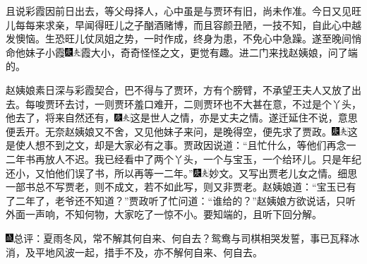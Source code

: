 且说彩霞因前日出去，等父母择人，心中虽是与贾环有旧，尚未作准。今日又见旺儿每每来求亲，早闻得旺儿之子酗酒赌博，而且容颜丑陋，一技不知，自此心中越发懊恼。生恐旺儿仗凤姐之势，一时作成，终身为患，不免心中急躁。遂至晚间悄命他妹子小霞{\includegraphics[width=3mm]{../Images/00004}\includegraphics[width=3mm]{../Images/00012}\footnotesize \kaishu 霞大小，奇奇怪怪之文，更觉有趣。}进二门来找赵姨娘，问了端的。

赵姨娘素日深与彩霞契合，巴不得与了贾环，方有个膀臂，不承望王夫人又放了出去。每唆贾环去讨，一则贾环羞口难开，二则贾环也不大甚在意，不过是个丫头，他去了，将来自然还有，{\includegraphics[width=3mm]{../Images/00004}\includegraphics[width=3mm]{../Images/00012}\footnotesize \kaishu 这是世人之情，亦是丈夫之情。}遂迁延住不说，意思便丢开。无奈赵姨娘又不舍，又见他妹子来问，是晚得空，便先求了贾政。{\includegraphics[width=3mm]{../Images/00004}\includegraphics[width=3mm]{../Images/00012}\footnotesize \kaishu 这是使人想不到之文，却是大家必有之事。}贾政因说道：“且忙什么，等他们再念一二年书再放人不迟。我已经看中了两个丫头，一个与宝玉，一个给环儿。只是年纪还小，又怕他们误了书，所以再等一二年。”{\includegraphics[width=3mm]{../Images/00004}\includegraphics[width=3mm]{../Images/00012}\footnotesize \kaishu 妙文。又写出贾老儿女之情。细思一部书总不写贾老，则不成文，若不如此写，则又非贾老。}赵姨娘道：“宝玉已有了二年了，老爷还不知道？”贾政听了忙问道：“谁给的？”赵姨娘方欲说话，只听外面一声响，不知何物，大家吃了一惊不小。要知端的，且听下回分解。

{\includegraphics[width=3mm]{../Images/00005}\kaishu 总评：夏雨冬风，常不解其何自来、何自去？鸳鸯与司棋相哭发誓，事已瓦释冰消，及平地风波一起，措手不及，亦不解何自来、何自去。}